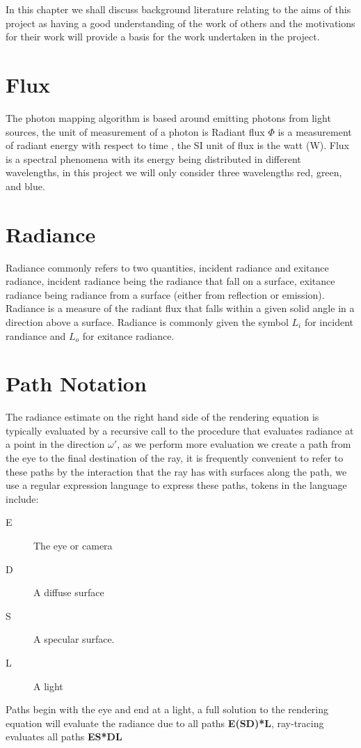 \label{chap:lit}
In this chapter we shall discuss background literature relating to the aims of this project as
having a good understanding of the work of others and the motivations for their work will provide
a basis for the work undertaken in the project.

\section{Flux}
The photon mapping algorithm is based around emitting photons from light sources, the unit of measurement of a photon is
Radiant flux $\Phi$ is a measurement of radiant energy with respect to time \cite{JensenBook}, the SI unit of flux is the watt (W).
Flux is a spectral phenomena with its energy being distributed in different wavelengths, in this project we will only consider
three wavelengths red, green, and blue.

\section{Radiance}
Radiance commonly refers to two quantities, incident radiance and exitance radiance, incident radiance being the radiance
that fall on a surface, exitance radiance being radiance from a surface (either from reflection or emission). Radiance
is a measure of the radiant flux that falls within a given solid angle in a direction above a surface. Radiance is commonly
given the symbol $L_i$ for incident randiance and $L_o$ for exitance radiance.



\section{Path Notation}
The radiance estimate on the right hand side of the rendering equation is typically evaluated by a recursive call to the
procedure that evaluates radiance at a point in the direction $\omega'$, as we perform more evaluation we create a path
from the eye to the final destination of the ray, it is frequently convenient to refer to these paths by the interaction
that the ray has with surfaces along the path, we use a regular expression language to express these paths, tokens in the
language include:
\begin{description}
\item[E] The eye or camera
\item[D] A diffuse surface
\item[S] A specular surface.
\item[L] A light
\end{description}

Paths begin with the eye and end at a light, a full solution to the rendering equation will evaluate the radiance due
to all paths \textbf{E(S\textbar D)*L}, ray-tracing evaluates all paths \textbf{ES*DL}









